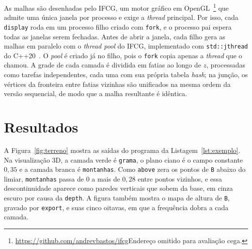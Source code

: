 \documentclass[sigconf, nonacm, screen, language=portuguese, language={main=english}]{acmart}
\newcommand{\anonfinal}[2]{\ifdefined\versaofinal#2\else#1\fi}
\begin{document}
As malhas são desenhadas pelo IFCG, um motor gráfico em
OpenGL~\cite{learnopengl}\footnote{\anonfinal{Endereço omitido para avaliação cega.}{\url{https://github.com/andrevbastos/ifcg}}}
que admite uma
única janela por processo e exige a \textit{thread} principal. Por isso,
cada \texttt{display} roda em um processo filho criado com
\texttt{fork}, e o processo pai espera todas as janelas serem fechadas.
Antes de abrir a janela, cada filho gera as malhas em paralelo com o
\textit{thread pool} do IFCG, implementado com \texttt{std::jthread} do
C++20~\cite{williams2019}. O \textit{pool} é criado já no filho, pois o
\texttt{fork} copia apenas a \textit{thread} que o chamou. A grade de
cada camada é dividida em fatias ao longo de $z$, processadas como
tarefas independentes, cada uma com sua própria tabela \textit{hash}; na
junção, os vértices da fronteira entre fatias vizinhas são unificados na
mesma ordem da versão sequencial, de modo que a malha resultante é
idêntica.

\section{Resultados}\label{sec:resultados}
A Figura~\ref{fig:terreno} mostra as saídas do programa da
Listagem~\ref{lst:exemplo}. Na visualização 3D, a camada verde é
\texttt{grama}, o plano ciano é o campo constante $0{,}35$ e a camada
branca é \texttt{montanhas}. Como \texttt{above} zera os pontos de
\texttt{B} abaixo do limiar, \texttt{montanhas} passa de 0 a mais de
$0{,}28$ entre pontos vizinhos, e essa descontinuidade aparece como
paredes verticais que sobem da base, em cinza escuro por causa da
\texttt{depth}. A figura também mostra o mapa de altura de
\texttt{B}, gravado por \texttt{export}, e suas cinco oitavas, em que
a frequência dobra a cada camada.
\end{document}
